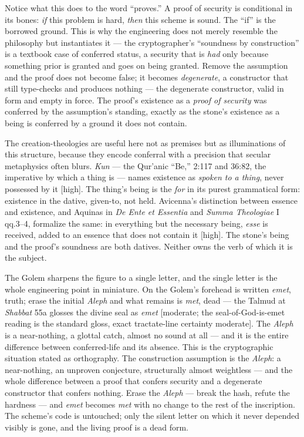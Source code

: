 \documentclass[11pt]{article}
\begin{document}
Notice what this does to the word ``proves.'' A proof of security is conditional in its bones: \emph{if} this problem is hard, \emph{then} this scheme is sound. The ``if'' is the borrowed ground. This is why the engineering does not merely resemble the philosophy but instantiates it — the cryptographer's ``soundness by construction'' is a textbook case of conferred status, a security that is \emph{had} only because something prior is granted and goes on being granted. Remove the assumption and the proof does not become false; it becomes \emph{degenerate}, a constructor that still type-checks and produces nothing — the degenerate constructor, valid in form and empty in force. The proof's existence as a \emph{proof of security} was conferred by the assumption's standing, exactly as the stone's existence as a being is conferred by a ground it does not contain.

The creation-theologies are useful here not as premises but as illuminations of this structure, because they encode conferral with a precision that secular metaphysics often blurs. \emph{Kun} — the Qur'anic ``Be,'' 2:117 and 36:82, the imperative by which a thing is — names existence as \emph{spoken to a thing}, never possessed by it [high]. The thing's being is the \emph{for} in its purest grammatical form: existence in the dative, given-to, not held. Avicenna's distinction between essence and existence, and Aquinas in \emph{De Ente et Essentia} and \emph{Summa Theologiae} I qq.3–4, formalize the same: in everything but the necessary being, \emph{esse} is received, added to an essence that does not contain it [high]. The stone's being and the proof's soundness are both datives. Neither owns the verb of which it is the subject.

The Golem sharpens the figure to a single letter, and the single letter is the whole engineering point in miniature. On the Golem's forehead is written \emph{emet}, truth; erase the initial \emph{Aleph} and what remains is \emph{met}, dead — the Talmud at \emph{Shabbat} 55a glosses the divine seal as \emph{emet} [moderate; the seal-of-God-is-emet reading is the standard gloss, exact tractate-line certainty moderate]. The \emph{Aleph} is a near-nothing, a glottal catch, almost no sound at all — and it is the entire difference between conferred-life and its absence. This is the cryptographic situation stated as orthography. The construction assumption is the \emph{Aleph}: a near-nothing, an unproven conjecture, structurally almost weightless — and the whole difference between a proof that confers security and a degenerate constructor that confers nothing. Erase the \emph{Aleph} — break the hash, refute the hardness — and \emph{emet} becomes \emph{met} with no change to the rest of the inscription. The scheme's code is untouched; only the silent letter on which it never depended visibly is gone, and the living proof is a dead form.
\end{document}
